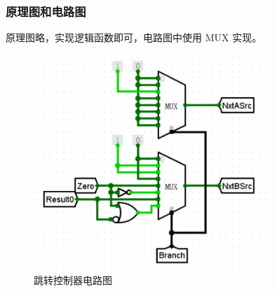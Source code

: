 \documentclass{article}
\begin{document}
    \subsubsection{原理图和电路图}
    原理图略，实现逻辑函数即可，电路图中使用 MUX 实现。

    \begin{figure}[H]
    \centering
    \includegraphics[width=0.8\textwidth]{5.4.png}
    \caption{跳转控制器电路图}
    \end{figure}
\end{document}
